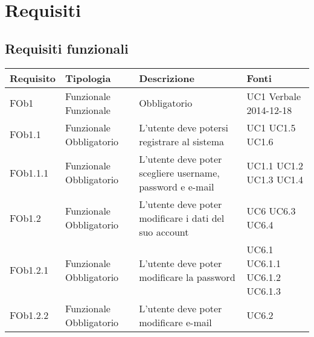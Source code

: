 \section{Requisiti}
\subsection{ Requisiti funzionali}
	
\begin{longtable}{|l|p{2.5cm}|p{2cm}|l|}
\hline
\textbf{Requisito} & \textbf{Tipologia} & \textbf{Descrizione} & \textbf{Fonti} \\
\hline
FOb1 & Funzionale \linebreak Funzionale & Obbligatorio & UC1 \linebreak Verbale 2014-12-18 \linebreak \\
\hline
FOb1.1 & Funzionale \linebreak Obbligatorio & L'utente deve potersi registrare al sistema & UC1 \linebreak  UC1.5 \linebreak  UC1.6 \linebreak  \\
\hline
FOb1.1.1 & Funzionale \linebreak Obbligatorio & L'utente deve poter scegliere username, password e e-mail & UC1.1 \linebreak  UC1.2 \linebreak  UC1.3 \linebreak  UC1.4 \linebreak  \\
\hline
FOb1.2 & Funzionale \linebreak Obbligatorio & L'utente deve poter modificare i dati del suo account & UC6 \linebreak  UC6.3 \linebreak  UC6.4 \linebreak  \\
\hline
FOb1.2.1 & Funzionale \linebreak Obbligatorio & L'utente deve poter modificare la password & UC6.1 \linebreak  UC6.1.1 \linebreak  UC6.1.2 \linebreak  UC6.1.3 \linebreak  \\
\hline
FOb1.2.2 & Funzionale \linebreak Obbligatorio & L'utente deve poter modificare e-mail & UC6.2 \linebreak  \\

\end{longtable}
